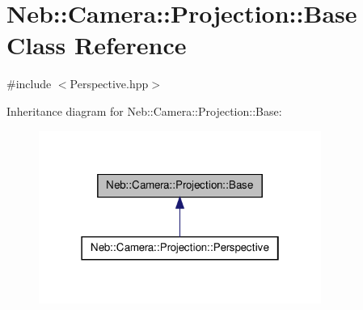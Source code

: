 \hypertarget{classNeb_1_1Camera_1_1Projection_1_1Base}{\section{\-Neb\-:\-:\-Camera\-:\-:\-Projection\-:\-:\-Base \-Class \-Reference}
\label{classNeb_1_1Camera_1_1Projection_1_1Base}
}


 




{\ttfamily \#include $<$\-Perspective.\-hpp$>$}



\-Inheritance diagram for \-Neb\-:\-:\-Camera\-:\-:\-Projection\-:\-:\-Base\-:\nopagebreak
\begin{figure}[H]
\begin{center}
\leavevmode
\includegraphics[width=262pt]{classNeb_1_1Camera_1_1Projection_1_1Base__inherit__graph}
\end{center}
\end{figure}

